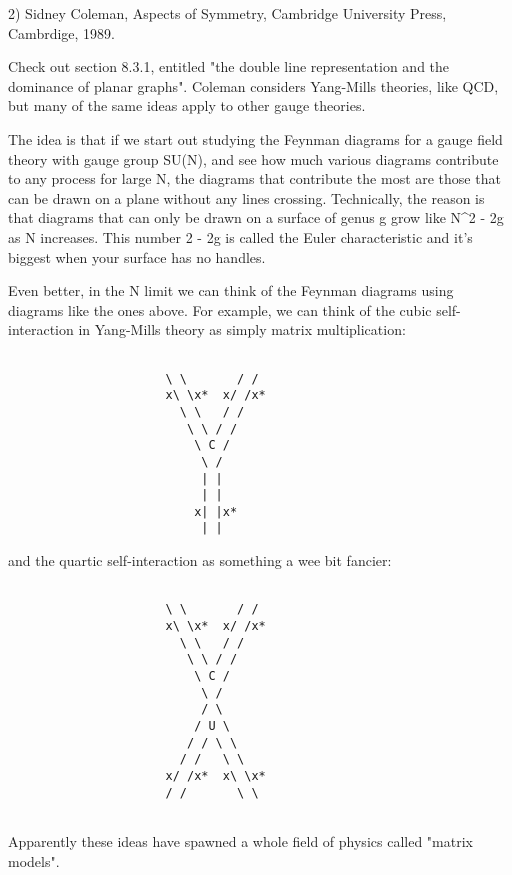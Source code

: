 2) Sidney Coleman, Aspects of Symmetry, Cambridge University Press,
Cambrdige, 1989.  

Check out section 8.3.1, entitled "the double line representation
and the dominance of planar graphs".  Coleman considers Yang-Mills
theories, like QCD, but many of the same ideas apply to other gauge
theories.   

The idea is that if we start out studying the Feynman diagrams for a gauge 
field theory with gauge group SU(N), and see how much various diagrams
contribute to any process for large N, the diagrams that contribute the
most are those that can be drawn on a plane without any lines crossing.
Technically, the reason is that diagrams that can only be drawn on a 
surface of genus g grow like N^{2 - 2g} as N increases.  This number
2 - 2g is called the Euler characteristic and it's biggest when
your surface has no handles.  

Even better, in the N \to  \infty  limit we can think of the Feynman
diagrams using diagrams like the ones above.  For example, we can 
think of the cubic self-interaction in Yang-Mills theory as simply
matrix multiplication:


\begin{verbatim}

                      \ \       / /
                      x\ \x*  x/ /x*
                        \ \   / /
                         \ \ / /
                          \ C /
                           \ /
                           | |
                           | |
                          x| |x*
                           | |

\end{verbatim}
    
and the quartic self-interaction as something a wee bit fancier:


\begin{verbatim}

                      \ \       / /
                      x\ \x*  x/ /x*
                        \ \   / /
                         \ \ / /
                          \ C /
                           \ /
                           / \
                          / U \
                         / / \ \
                        / /   \ \
                      x/ /x*  x\ \x*
                      / /       \ \ 


\end{verbatim}
    
Apparently these ideas have spawned a whole field of physics called
"matrix models".

